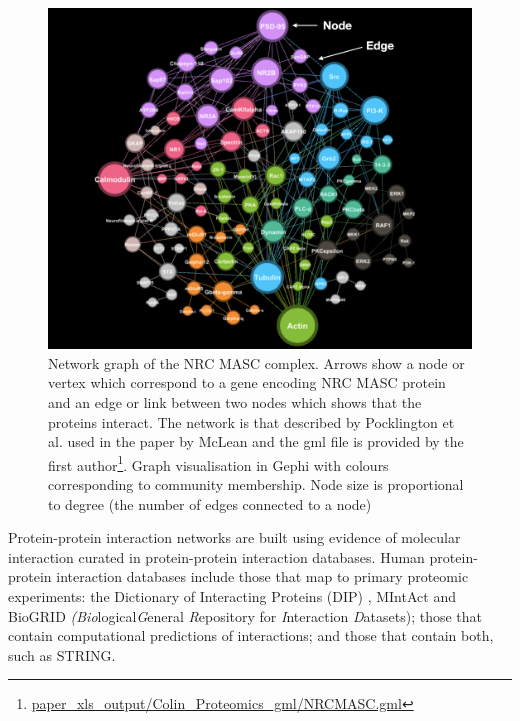 \begin{figure}
    \centering
    \includegraphics[width=\textwidth]{images/nrc_arrow.png}
        \caption[Network graph of the NRC MASC complex.]{Network graph of the NRC MASC complex. Arrows show a node or vertex which correspond to a gene encoding NRC MASC protein and an edge or link between two nodes which shows that the proteins interact. The network is that described by Pocklington et al. \cite{pocklington2006proteomes} used in the paper by McLean\cite{mclean2016improved} and the gml file is provided by the first author\footnote{\url{paper_xls_output/Colin_Proteomics_gml/NRCMASC.gml}}. Graph visualisation in Gephi\cite{bastian2009gephi} with colours corresponding to community membership. Node size is proportional to degree (the number of edges connected to a node)}
    \label{fig:nrcmasc}
\end{figure}


Protein-protein interaction networks are built using evidence of molecular interaction curated in protein-protein interaction databases. Human protein-protein interaction databases include those that map to primary proteomic experiments:   the Dictionary of Interacting Proteins (DIP) \cite{salwinski2004database}, MIntAct\cite{orchard2014mintact} and BioGRID \textit{(Bio}logical\textit{G}eneral \textit{R}epository for \textit{I}nteraction \textit{D}atasets)\cite{chatr2017biogrid}; those that contain computational predictions of interactions; and those that contain both, such as STRING\cite{szklarczyk2019string}.

